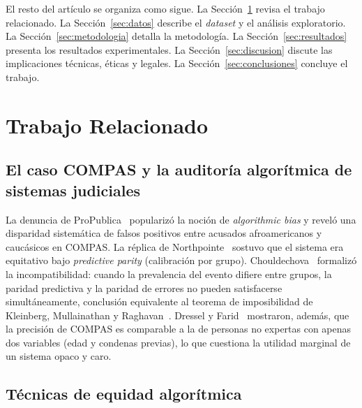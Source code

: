 \documentclass[11pt,a4paper]{article}
\begin{document}
El resto del artículo se organiza como sigue.
La Sección~\ref{sec:related} revisa el trabajo relacionado.
La Sección~\ref{sec:datos} describe el \textit{dataset} y el análisis exploratorio.
La Sección~\ref{sec:metodologia} detalla la metodología.
La Sección~\ref{sec:resultados} presenta los resultados experimentales.
La Sección~\ref{sec:discusion} discute las implicaciones técnicas, éticas y legales.
La Sección~\ref{sec:conclusiones} concluye el trabajo.


\section{Trabajo Relacionado}
\label{sec:related}

\subsection{El caso COMPAS y la auditoría algorítmica de sistemas judiciales}

La denuncia de ProPublica~\cite{angwin2016machine} popularizó la noción de \textit{algorithmic bias} y reveló una disparidad sistemática de falsos positivos entre acusados afroamericanos y caucásicos en COMPAS. La réplica de Northpointe~\cite{dieterich2016compas} sostuvo que el sistema era equitativo bajo \textit{predictive parity} (calibración por grupo). Chouldechova~\cite{chouldechova2017fair} formalizó la incompatibilidad: cuando la prevalencia del evento difiere entre grupos, la paridad predictiva y la paridad de errores no pueden satisfacerse simultáneamente, conclusión equivalente al teorema de imposibilidad de Kleinberg, Mullainathan y Raghavan~\cite{kleinberg2017inherent}. Dressel y Farid~\cite{dressel2018accuracy} mostraron, además, que la precisión de COMPAS es comparable a la de personas no expertas con apenas dos variables (edad y condenas previas), lo que cuestiona la utilidad marginal de un sistema opaco y caro.

\subsection{Técnicas de equidad algorítmica}
\end{document}
